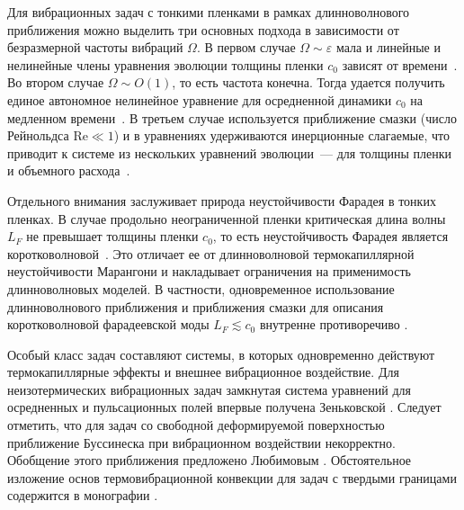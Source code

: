 \documentclass[12pt,a4paper]{article}
\begin{document}
Для вибрационных задач с тонкими пленками в рамках длинноволнового 
приближения можно выделить три основных подхода в зависимости от 
безразмерной частоты вибраций $\Omega$. В первом случае $\Omega \sim 
\varepsilon$ мала и линейные и нелинейные члены уравнения эволюции 
толщины пленки $c_0$ зависят от времени~\cite{Halpern2001, Oron2002}. 
Во втором случае $\Omega \sim O(1)$, то есть частота конечна. Тогда 
удается получить единое автономное нелинейное уравнение для осредненной 
динамики $c_0$ на медленном времени~\cite{Shklyaev2008, Shklyaev2009}. 
В третьем случае используется приближение смазки (число Рейнольдса $\mathrm{Re} \ll 1$) 
и в уравнениях удерживаются инерционные слагаемые, что приводит к системе из нескольких 
уравнений эволюции~--- для толщины пленки и объемного 
расхода~\cite{Bestehorn2013, Rojas2010, Rojas2011}.

Отдельного внимания заслуживает природа неустойчивости Фарадея в тонких пленках. В случае продольно неограниченной пленки критическая 
длина волны $L_F$ не превышает толщины пленки $c_0$, то есть 
неустойчивость Фарадея является коротковолновой~\cite{Shklyaev2015}. 
Это отличает ее от длинноволновой термокапиллярной 
неустойчивости Марангони и накладывает ограничения на 
применимость длинноволновых моделей. В частности, одновременное 
использование длинноволнового приближения и приближения смазки 
для описания коротковолновой фарадеевской моды $L_F \lesssim c_0$  \cite{Rojas2010, Rojas2011} внутренне противоречиво \cite{Shklyaev2015}. 



Особый класс задач составляют системы, в которых одновременно действуют термокапиллярные эффекты и внешнее вибрационное воздействие. Для неизотермических вибрационных задач замкнутая система уравнений для осредненных и пульсационных полей впервые получена Зеньковской  \cite{Zenkovskaya1966}. Следует отметить, что для задач со свободной деформируемой поверхностью приближение Буссинеска при вибрационном воздействии некорректно. Обобщение этого приближения предложено Любимовым  \cite{Lyubimov1994, Lyubimov1995}. Обстоятельное изложение основ термовибрационной конвекции для задач с твердыми границами содержится в монографии  \cite{Gershuni1998}.
\end{document}
